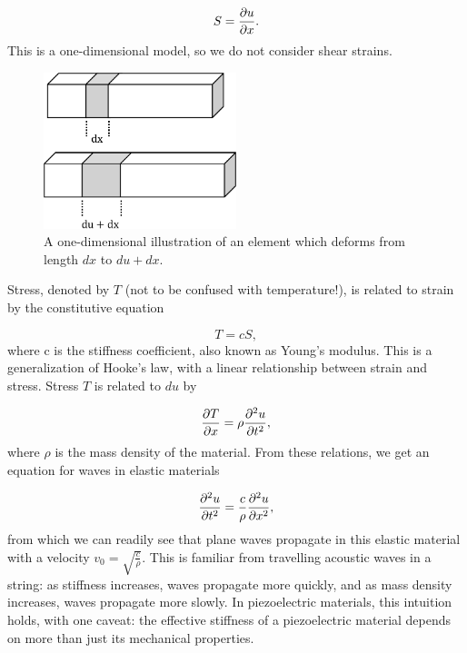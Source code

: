 \documentclass[double,12pt,1in]{beavtex}
\begin{document}
\begin{equation}
    S = \pdv{u}{x}. \label{strain-displacement equation}
\end{equation}
This is a one-dimensional model, so we do not consider shear strains.
\begin{figure}
    \includegraphics[width = 0.5\textwidth]{displacement field.pdf}
    \caption{A one-dimensional illustration of an element which deforms from length $dx$ to $du + dx$.} \label{dfield}
\end{figure}
Stress, denoted by $T$ (not to be confused with temperature!), is related to strain by the constitutive equation

\begin{equation}
    T = cS, \label{elastic Hooke's}
\end{equation}
where c is the stiffness coefficient, also known as Young's modulus. This is a generalization of Hooke's law, with a linear relationship between strain and stress. Stress $T$ is related to $du$ by 

\begin{equation}
    \pdv{T}{x} = \rho \pdv[2]{u}{t}, \label{stress related to displacement}
\end{equation}
where $\rho$ is the mass density of the material. From these relations, we get an equation for waves in elastic materials

\begin{equation}
    \pdv[2]{u}{t} = \frac{c}{\rho} \pdv[2]{u}{x},
\end{equation}
from which we can readily see that plane waves propagate in this elastic material with a velocity $v_0 = \sqrt{\frac{c}{\rho}}$. This is familiar from travelling acoustic waves in a string: as stiffness increases, waves propagate more quickly, and as mass density increases, waves propagate more slowly. In piezoelectric materials, this intuition holds, with one caveat: the effective stiffness of a piezoelectric material depends on more than just its mechanical properties.
\end{document}
